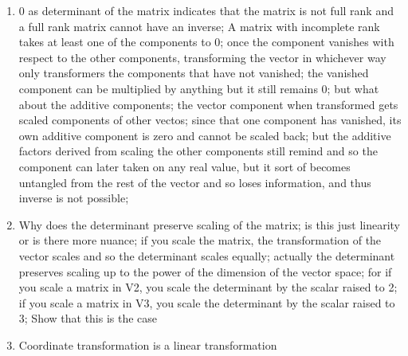 \documentclass{article}
\begin{document}
\begin{enumerate}
        \item 0 as determinant of the matrix indicates that the matrix is not full rank and a full rank matrix cannot have an inverse; A matrix with incomplete rank takes at least one of the components to 0; once the component vanishes with respect to the other components, transforming the vector in whichever way only transformers the components that have not vanished; the vanished component can be multiplied by anything but it still remains 0;  but what about the additive components; the vector component when transformed gets scaled components of other vectos; since that one component has vanished, its own additive component is zero and cannot be scaled back; but the additive factors derived from scaling the other components still remind and so the component can later taken on any real value, but it sort of becomes untangled from the rest of the vector and so loses information, and thus inverse is not possible;
        \item Why does the determinant preserve scaling of the matrix; is this just linearity or is there more nuance; if you scale the matrix, the transformation of the vector scales and so the determinant scales equally; actually the determinant preserves scaling up to the power of the dimension of the vector space; for if you scale a matrix in V2, you scale the determinant by the scalar raised to 2; if you scale a matrix in V3, you scale the determinant by the scalar raised to 3; Show that this is the case
        \item Coordinate transformation is a linear transformation






    \end{enumerate}
\end{document}
